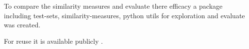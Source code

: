 
To compare the similarity measures and evaluate there efficacy a package including test-sets,
similarity-measures, python utils for exploration and evaluate was created.

For reuse it is available publicly \cite{ethereum-contract-similarity}.
